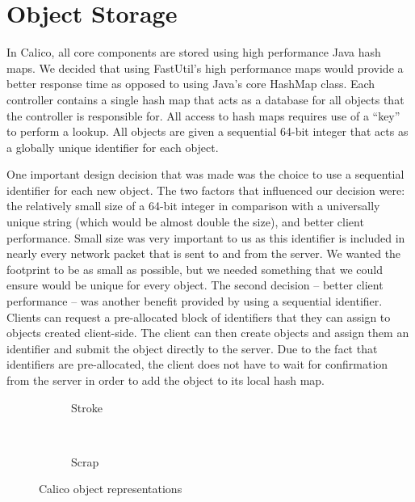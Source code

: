 \section{Object Storage}
In Calico, all core components are stored using high performance Java hash maps. 
We decided that using FastUtil's \cite{fastutil} high performance maps would provide a better response time as opposed to using Java's core HashMap class. 
Each controller contains a single hash map that acts as a database for all objects that the controller is responsible for.
All access to hash maps requires use of a ``key'' to perform a lookup.
All objects are given a sequential 64-bit integer that acts as a globally unique identifier for each object.

One important design decision that was made was the choice to use a sequential identifier for each new object. The two factors that influenced our decision were: the relatively small size of a 64-bit integer in comparison with a universally unique string (which would be almost double the size), and better client performance.
Small size was very important to us as this identifier is included in nearly every network packet that is sent to and from the server. We wanted the footprint to be as small as possible, but we needed something that we could ensure would be unique for every object. 
The second decision -- better client performance -- was another benefit provided by using a sequential identifier. Clients can request a pre-allocated block of identifiers that they can assign to objects created client-side. The client can then create objects and assign them an identifier and submit the object directly to the server. Due to the fact that identifiers are pre-allocated, the client does not have to wait for confirmation from the server in order to add the object to its local hash map.


\begin{figure}[h!]
  \centering
  \begin{subfigure}[t]{0.4\textwidth}
    \centering
    \small
    
    \normalsize
    \caption{Stroke}
    \label{code:stroke_storage}
  \end{subfigure}%
  ~ 
  \begin{subfigure}[t]{0.4\textwidth}
    \centering
    \small
    
    \normalsize
    \caption{Scrap}
    \label{code:scrap_storage}
  \end{subfigure}
  \caption{Calico object representations}
  \label{code:storage}
\end{figure}

